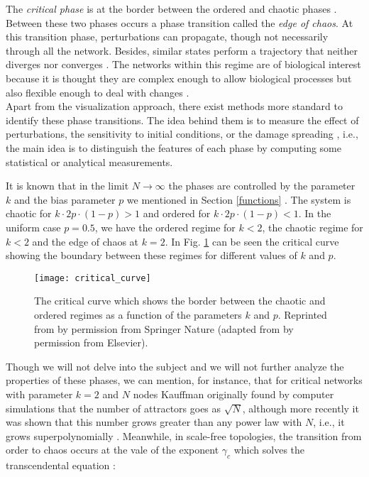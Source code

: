 The \textit{critical phase} is at the border between the ordered and chaotic phases \cite{rbn_barbara}. Between these two phases occurs a phase transition called the \textit{edge of chaos}. At this transition phase, perturbations can propagate, though not necessarily through all the network. Besides, similar states perform a trajectory that neither diverges nor converges \cite{rbn_carlos}. The networks within this regime are of biological interest because it is thought they are complex enough to allow biological processes but also flexible enough to deal with changes \cite{attractors}.\\

Apart from the visualization approach, there exist methods more standard to identify these phase transitions. The idea behind them is to measure the effect of perturbations, the sensitivity to initial conditions, or the damage spreading \cite{rbn_carlos}, i.e., the main idea is to distinguish the features of each phase by computing some statistical or analytical measurements. 

It is known that in the limit $N\rightarrow \infty$ the phases are controlled by the parameter $k$ and the bias parameter $p$ we mentioned in Section \ref{functions} \cite{attractors}. The system is chaotic for $k\cdot 2p \cdot (1-p) >1$ and ordered for $k\cdot 2p \cdot (1-p) <1$. In the uniform case $p=0.5$, we have the ordered regime for $k<2$, the chaotic regime for $k<2$ and the edge of chaos at $k=2$. In Fig. \ref{fig:critical_curve} can be seen the critical curve showing the boundary between these regimes for different values of $k$ and $p$.

\begin{figure}
	\centering
		\texttt{[image: critical\_curve]}
	\caption[Dynamical phases of Boolean Networks.]{The critical curve which shows the border between the chaotic and ordered regimes as a function of the parameters $k$ and $p$. Reprinted from \cite{attractors} by permission from Springer Nature (adapted from \cite{rbn_aldana} by permission from Elsevier).}
	\label{fig:critical_curve}
\end{figure}

Though we will not delve into the subject and we will not further analyze the properties of these phases, we can mention, for instance, that for critical networks with parameter $k=2$ and $N$ nodes Kauffman originally found by computer simulations that the number of attractors goes as $\sqrt{N}$, although more recently it was shown that this number grows greater than any power law with $N$, i.e., it grows superpolynomially \cite{attractors}. Meanwhile, in scale-free topologies, the transition from order to chaos occurs at the vale of the exponent $\gamma_{c}$ which solves the transcendental equation \cite{rbn_aldana}:

